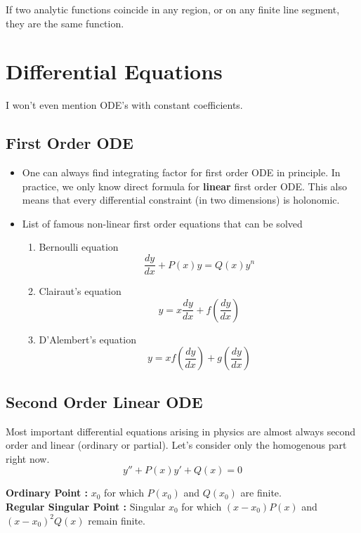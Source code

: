 \documentclass{report}
\begin{document}
\noindent If two analytic functions coincide in any region, or on any finite line segment, they are the same function.


\chapter{Differential Equations}

I won't even mention ODE's with constant coefficients.
\section{First Order ODE}

\begin{itemize}
  \item One can always find integrating factor for first order ODE in principle. In practice, we only know direct formula for \textbf{linear} first order ODE. This also means that every differential constraint (in two dimensions) is holonomic.

  \item List of famous non-linear first order equations that can be solved

    \begin{enumerate}
      \item Bernoulli equation
        $$\frac{dy}{dx} + P(x)y = Q(x)y^n$$
      \item Clairaut's equation
        $$y = x\frac{dy}{dx} + f\left(\frac{dy}{dx}\right)$$
      \item D'Alembert's equation
        $$y = xf\left(\frac{dy}{dx}\right) + g\left(\frac{dy}{dx}\right)$$
    \end{enumerate}

\end{itemize}

\section{Second Order Linear ODE}
Most important differential equations arising in physics are almost always second order and linear (ordinary or partial). Let's consider only the homogenous part right now.
$$y'' + P(x)y' + Q(x) = 0$$

\noindent \textbf{Ordinary Point :} $x_0$ for which $P(x_0)$ and $Q(x_0)$ are finite.\\

\noindent \textbf{Regular Singular Point :} Singular $x_0$ for which $(x-x_0)P(x)$ and $(x-x_0)^2 Q(x)$ remain finite.\\
\end{document}

